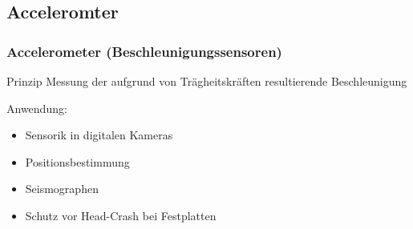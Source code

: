 \documentclass[10pt,a4paper,oneside]{beamer}
\begin{document}
\begin{frame}
	\section{Acceleromter}
	\frametitle{Accelerometer (Beschleunigungssensoren)}
	\begin{block}{Prinzip}
		Messung der aufgrund von Trägheitskräften resultierende Beschleunigung
	\end{block}
	Anwendung:
	\begin{itemize}
  		\item Sensorik in digitalen Kameras
		\item Positionsbestimmung
		\item Seismographen 
		\item Schutz vor Head-Crash bei Festplatten
	\end{itemize}
	\begin{figure}
\hfil
{}\hfil
\end{figure}

\end{frame}
\end{document}
